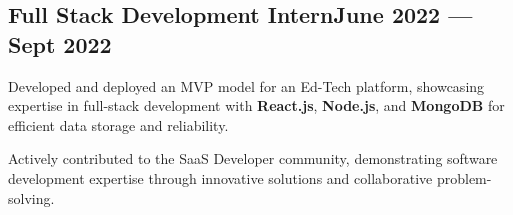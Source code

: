 \subsection{{Full Stack Development Intern\hfill June 2022 --- Sept 2022}}
\begin{zitemize}
\item Developed and deployed an MVP model for an Ed-Tech platform, showcasing expertise in full-stack development with \textbf{React.js}, \textbf{Node.js}, and \textbf{MongoDB} for efficient data storage and reliability.
\item Actively contributed to the SaaS Developer community, demonstrating software development expertise through innovative solutions and collaborative problem-solving.
\end{zitemize}

